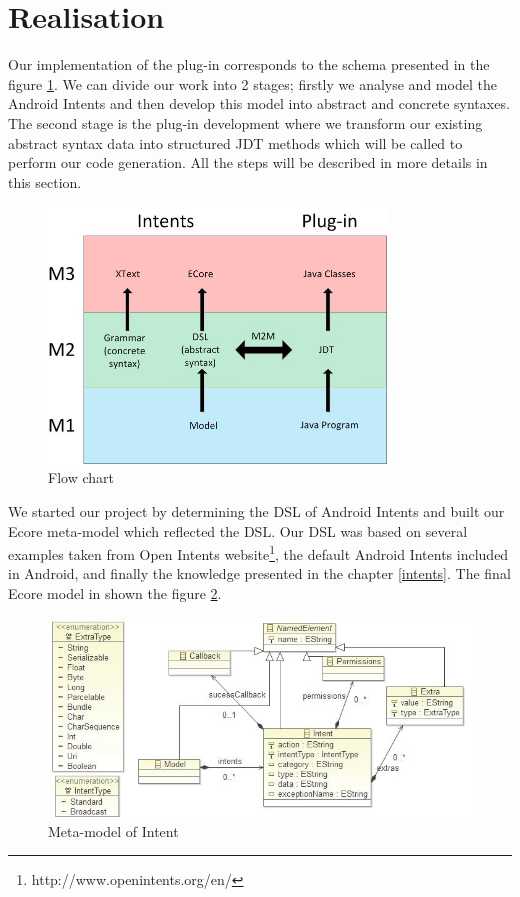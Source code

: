 \section{Realisation}

Our implementation of the plug-in corresponds to the schema presented in the figure \ref{flowchart}. We can divide our work into 2 stages; firstly we analyse and model the Android Intents and then develop this model into abstract and concrete syntaxes. The second stage is the plug-in development where we transform our existing abstract syntax data into structured JDT methods which will be called to perform our code generation. All the steps will be described in more details in this section.  

\begin{figure}[H]
\label{flowchart}
  \centering
    \includegraphics[width=0.8\textwidth]{flowchart}
  \caption{Flow chart}
\end{figure}

We started our project by determining the DSL of Android Intents and built our Ecore meta-model which reflected the DSL. Our DSL was based on several examples taken from Open Intents website\footnote{http://www.openintents.org/en/}, the default Android Intents included in Android, and finally the knowledge presented in the chapter \ref{intents}. The final Ecore model in shown the figure \ref{meta-model}.

\begin{figure}[H]
\label{meta-model}
  \centering
    \includegraphics[width=\textwidth]{metamodel}
  \caption{Meta-model of Intent}
\end{figure}

